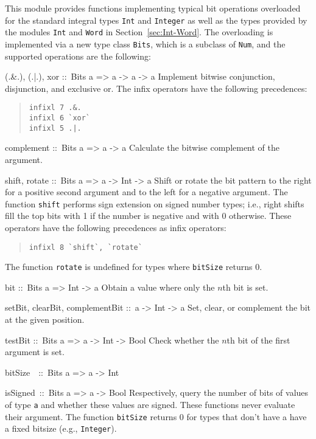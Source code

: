 \documentclass[a4paper,twoside]{article}
\makeatletter
\newcommand{\code}[1]{\texttt{#1}}      %
\newenvironment{codedesc}{%
  \list{}{\labelwidth\z@
    \let\makelabel\codedesclabel}
  }{%
  \endlist
  }
\newcommand*{\codedesclabel}[1]{%
  \hspace{-\leftmargin}
  \parbox[b]{\labelwidth}{\makebox[0pt][l]{\code{#1}}\\}\hfil\relax
  }
\newcommand{\combineitems}{\vspace*{-\itemsep}\vspace*{-\parsep}\vspace*{-1em}}
\makeatother
\begin{document}
This module provides functions implementing typical bit operations overloaded
for the standard integral types \code{Int} and \code{Integer} as well as the
types provided by the modules \code{Int} and \code{Word} in
Section~\ref{sec:Int-Word}.  The overloading is implemented via a new type
class \code{Bits}, which is a subclass of \code{Num}, and the supported
operations are the following:
%
\begin{codedesc}
\item[(.\&.), (.|.), xor ::\ Bits a => a -> a -> a]  Implement bitwise
  conjunction, disjunction, and exclusive or.  The infix operators have the
  following precedences:
  \begin{quote}
\begin{verbatim}
infixl 7 .&.
infixl 6 `xor`
infixl 5 .|.
\end{verbatim}
  \end{quote}
  
\item[complement ::\ Bits a => a -> a] Calculate the bitwise complement of the
  argument.
  
\item[shift, rotate ::\ Bits a => a -> Int -> a] Shift or rotate the bit
  pattern to the right for a positive second argument and to the left for a
  negative argument.  The function \code{shift} performs sign extension on
  signed number types; i.e., right shifts fill the top bits with 1 if the
  number is negative and with 0 otherwise.  These operators have the following
  precedences as infix operators:
  \begin{quote}
\begin{verbatim}
infixl 8 `shift`, `rotate`
\end{verbatim}
  \end{quote}
  The function \code{rotate} is undefined for types where \code{bitSize}
  returns 0.
  
\item[bit ::\ Bits a => Int -> a] Obtain a value where only the $n$th bit
  is set.
  
\item[setBit, clearBit, complementBit ::\ a -> Int -> a] Set, clear, or
  complement the bit at the given position.
  
\item[testBit ::\ Bits a => a -> Int -> Bool] Check whether the $n$th bit of
  the first argument is set.

\item[bitSize~~::\ Bits a => a -> Int]
\item[isSigned~::\ Bits a => a -> Bool]\combineitems Respectively, query the
  number of bits of values of type \code{a} and whether these values are
  signed.  These functions never evaluate their argument.  The function
  \code{bitSize} returns 0 for types that don't have a have a fixed bitsize
  (e.g., \code{Integer}).


\end{codedesc}
\end{document}
